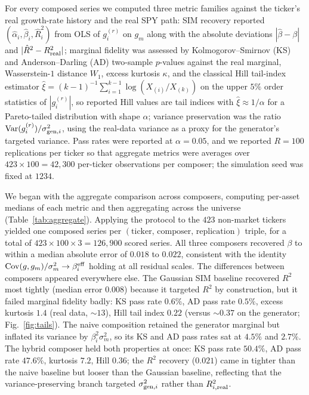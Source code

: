 For every composed series we computed three metric families against
the ticker's real growth-rate history and the real SPY path: SIM
recovery reported $(\hat\alpha_i, \hat\beta_i, \hat R^2_i)$ from OLS of $g_i^{(r)}$ on $g_m$ along with the absolute
deviations $|\hat\beta - \beta|$ and $|\hat R^2 - R^2_{\mathrm{real}}|$;
marginal fidelity was assessed by Kolmogorov--Smirnov (KS) and
Anderson--Darling (AD) two-sample $p$-values against the real
marginal, Wasserstein-$1$ distance $W_1$, excess kurtosis $\kappa$,
and the classical Hill tail-index estimator
$\hat\xi = (k-1)^{-1}\sum_{i=1}^{k-1}\log(X_{(i)}/X_{(k)})$ on the
upper $5\%$ order statistics of $|g_i^{(r)}|$, so reported Hill values
are tail indices with $\hat\xi \approx 1/\alpha$ for a Pareto-tailed
distribution with shape $\alpha$; variance preservation was the ratio
$\mathrm{Var}(g_i^{(r)}) / \sigma_{\mathrm{gen},i}^2$, using the real-data
variance as a proxy for the generator's targeted variance. Pass rates
were reported at $\alpha = 0.05$, and we reported $R = 100$
replications per ticker so that aggregate metrics were averages over
$423 \times 100 = 42{,}300$ per-ticker observations per composer;
the simulation seed was fixed at $1234$.

We began with the aggregate comparison across composers, computing per-asset medians of
each metric and then aggregating across the universe (Table~\ref{tab:aggregate}). 
Applying the protocol to the $423$ non-market tickers yielded one
composed series per $(\mathrm{ticker},\, \mathrm{composer},\,
\mathrm{replication})$ triple, for a total of
$423 \times 100 \times 3 = 126{,}900$ scored series.  All three composers recovered $\beta$ to
within a median absolute error of $0.018$ to $0.022$, consistent with
the identity $\mathrm{Cov}(g, g_m)/\sigma_m^2 \to \beta_i^{\mathrm{eff}}$
holding at all residual scales. The differences between composers
appeared everywhere else. The Gaussian SIM baseline recovered $R^2$
most tightly (median error $0.008$) because it targeted $R^2$ by
construction, but it failed marginal fidelity badly: KS pass rate
$0.6\%$, AD pass rate $0.5\%$, excess kurtosis $1.4$ (real data,
$\sim 13$), Hill tail index $0.22$ (versus $\sim 0.37$ on the
generator; Fig.~\ref{fig:tails}). The naive composition retained the generator marginal but
inflated its variance by $\beta_i^2 \sigma_m^2$, so its KS and AD
pass rates sat at $4.5\%$ and $2.7\%$. The hybrid composer held both
properties at once: KS pass rate $50.4\%$, AD pass rate $47.6\%$,
kurtosis $7.2$, Hill $0.36$; the $R^2$ recovery ($0.021$) came in
tighter than the naive baseline but looser than the Gaussian
baseline, reflecting that the variance-preserving branch targeted
$\sigma_{\mathrm{gen},i}^2$ rather than $R^2_{i,\mathrm{real}}$.


